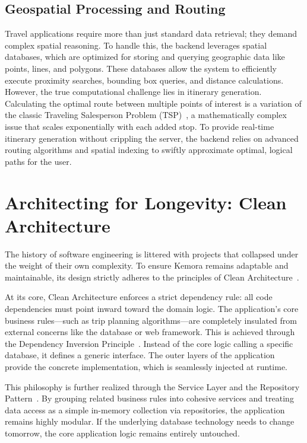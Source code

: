 \subsection{Geospatial Processing and Routing}
Travel applications require more than just standard data retrieval; they demand complex spatial reasoning. To handle this, the backend leverages spatial databases, which are optimized for storing and querying geographic data like points, lines, and polygons. These databases allow the system to efficiently execute proximity searches, bounding box queries, and distance calculations. However, the true computational challenge lies in itinerary generation. Calculating the optimal route between multiple points of interest is a variation of the classic Traveling Salesperson Problem (TSP)~\cite{tsp}, a mathematically complex issue that scales exponentially with each added stop. To provide real-time itinerary generation without crippling the server, the backend relies on advanced routing algorithms and spatial indexing to swiftly approximate optimal, logical paths for the user.

\section{Architecting for Longevity: Clean Architecture}
The history of software engineering is littered with projects that collapsed under the weight of their own complexity. To ensure Kemora remains adaptable and maintainable, its design strictly adheres to the principles of Clean Architecture~\cite{clean_architecture}. 

At its core, Clean Architecture enforces a strict dependency rule: all code dependencies must point inward toward the domain logic. The application's core business rules—such as trip planning algorithms—are completely insulated from external concerns like the database or web framework. This is achieved through the Dependency Inversion Principle~\cite{dip}. Instead of the core logic calling a specific database, it defines a generic interface. The outer layers of the application provide the concrete implementation, which is seamlessly injected at runtime.

This philosophy is further realized through the Service Layer and the Repository Pattern~\cite{poeaa}. By grouping related business rules into cohesive services and treating data access as a simple in-memory collection via repositories, the application remains highly modular. If the underlying database technology needs to change tomorrow, the core application logic remains entirely untouched.


